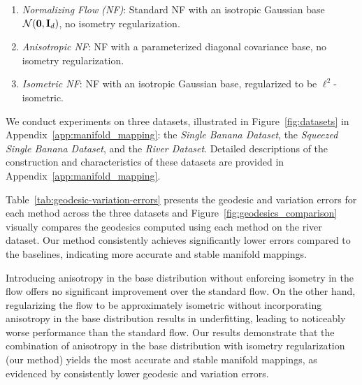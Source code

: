 \begin{enumerate}[label=(\arabic*)]  
    \item \emph{Normalizing Flow (NF)}: Standard NF with an isotropic Gaussian base \(\mathcal{N}(\mathbf{0}, \mathbf{I}_d)\), no isometry regularization.  
    \item \emph{Anisotropic NF}: NF with a parameterized diagonal covariance base, no isometry regularization.  
    \item \emph{Isometric NF}: NF with an isotropic Gaussian base, regularized to be \(\ell^2\)-isometric.  
\end{enumerate}  


We conduct experiments on three datasets, illustrated in Figure~\ref{fig:datasets} in Appendix~\ref{app:manifold_mapping}: the \emph{Single Banana Dataset}, the \emph{Squeezed Single Banana Dataset}, and the \emph{River Dataset}. Detailed descriptions of the construction and characteristics of these datasets are provided in Appendix~\ref{app:manifold_mapping}.

Table~\ref{tab:geodesic-variation-errors} presents the geodesic and variation errors for each method across the three datasets and Figure~\ref{fig:geodesics_comparison} visually compares the geodesics computed using each method on the river dataset. Our method consistently achieves significantly lower errors compared to the baselines, indicating more accurate and stable manifold mappings. 

Introducing anisotropy in the base distribution without enforcing isometry in the flow offers no significant improvement over the standard flow. On the other hand, regularizing the flow to be approximately isometric without incorporating anisotropy in the base distribution results in underfitting, leading to noticeably worse performance than the standard flow. Our results demonstrate that the combination of anisotropy in the base distribution with isometry regularization (our method) yields the most accurate and stable manifold mappings, as evidenced by consistently lower geodesic and variation errors.

